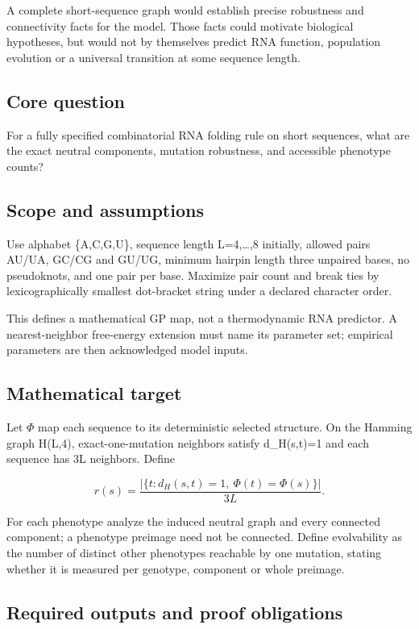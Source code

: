 \documentclass[
  11pt,
]{article}
\begin{document}
A complete short-sequence graph would establish precise robustness and
connectivity facts for the model. Those facts could motivate biological
hypotheses, but would not by themselves predict RNA function, population
evolution or a universal transition at some sequence length.

\subsection{Core question}

For a fully specified combinatorial RNA folding rule on short sequences,
what are the exact neutral components, mutation robustness, and
accessible phenotype counts?

\subsection{Scope and assumptions}

Use alphabet \{A,C,G,U\}, sequence length L=4,\ldots,8 initially,
allowed pairs AU/UA, GC/CG and GU/UG, minimum hairpin length three
unpaired bases, no pseudoknots, and one pair per base. Maximize pair
count and break ties by lexicographically smallest dot-bracket string
under a declared character order.

This defines a mathematical GP map, not a thermodynamic RNA predictor. A
nearest-neighbor free-energy extension must name its parameter set;
empirical parameters are then acknowledged model inputs.

\subsection{Mathematical target}

Let \ensuremath{\Phi} map each sequence to its deterministic selected
structure. On the Hamming graph H(L,4), exact-one-mutation neighbors
satisfy d\_H(s,t)=1 and each sequence has 3L neighbors. Define

\[r(s)=\frac{|\{t:d_H(s,t)=1,\ \Phi (t)=\Phi (s)\}|}{3L}.\]

For each phenotype analyze the induced neutral graph and every connected
component; a phenotype preimage need not be connected. Define
evolvability as the number of distinct other phenotypes reachable by one
mutation, stating whether it is measured per genotype, component or
whole preimage.

\subsection{Required outputs and proof obligations}
\end{document}

